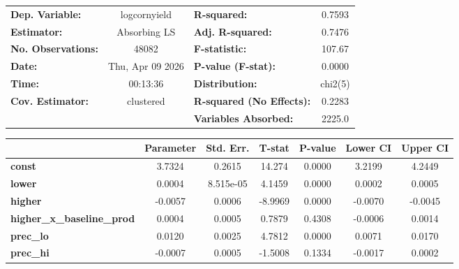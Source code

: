 \begin{center}
\begin{tabular}{lclc}
\toprule
\textbf{Dep. Variable:}            &    logcornyield    & \textbf{  R-squared:         }     &      0.7593      \\
\textbf{Estimator:}                &    Absorbing LS    & \textbf{  Adj. R-squared:    }     &      0.7476      \\
\textbf{No. Observations:}         &       48082        & \textbf{  F-statistic:       }     &      107.67      \\
\textbf{Date:}                     &  Thu, Apr 09 2026  & \textbf{  P-value (F-stat):  }     &      0.0000      \\
\textbf{Time:}                     &      00:13:36      & \textbf{  Distribution:      }     &     chi2(5)      \\
\textbf{Cov. Estimator:}           &     clustered      & \textbf{  R-squared (No Effects):} &      0.2283      \\
\textbf{}                          &                    & \textbf{  Variables Absorbed:}     &      2225.0      \\
\bottomrule
\end{tabular}
\begin{tabular}{lcccccc}
                                   & \textbf{Parameter} & \textbf{Std. Err.} & \textbf{T-stat} & \textbf{P-value} & \textbf{Lower CI} & \textbf{Upper CI}  \\
\midrule
\textbf{const}                     &       3.7324       &       0.2615       &      14.274     &      0.0000      &       3.2199      &       4.2449       \\
\textbf{lower}                     &       0.0004       &     8.515e-05      &      4.1459     &      0.0000      &       0.0002      &       0.0005       \\
\textbf{higher}                    &      -0.0057       &       0.0006       &     -8.9969     &      0.0000      &      -0.0070      &      -0.0045       \\
\textbf{higher\_x\_baseline\_prod} &       0.0004       &       0.0005       &      0.7879     &      0.4308      &      -0.0006      &       0.0014       \\
\textbf{prec\_lo}                  &       0.0120       &       0.0025       &      4.7812     &      0.0000      &       0.0071      &       0.0170       \\
\textbf{prec\_hi}                  &      -0.0007       &       0.0005       &     -1.5008     &      0.1334      &      -0.0017      &       0.0002       \\
\bottomrule
\end{tabular}
\end{center}